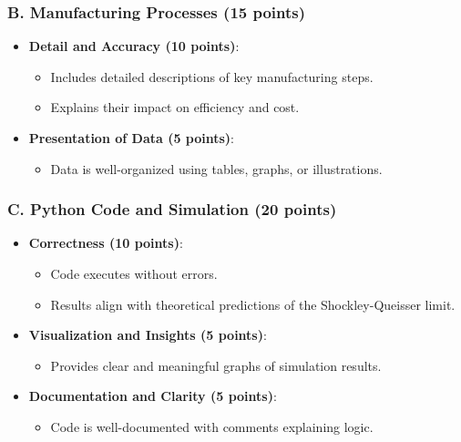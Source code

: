 \documentclass[11pt]{article}
\begin{document}
\subsubsection*{B. Manufacturing Processes (15 points)}
\begin{itemize}
    \item \textbf{Detail and Accuracy (10 points)}:
    \begin{itemize}
        \item Includes detailed descriptions of key manufacturing steps.
        \item Explains their impact on efficiency and cost.
    \end{itemize}
    \item \textbf{Presentation of Data (5 points)}:
    \begin{itemize}
        \item Data is well-organized using tables, graphs, or illustrations.
    \end{itemize}
\end{itemize}

\subsubsection*{C. Python Code and Simulation (20 points)}
\begin{itemize}
    \item \textbf{Correctness (10 points)}:
    \begin{itemize}
        \item Code executes without errors.
        \item Results align with theoretical predictions of the Shockley-Queisser limit.
    \end{itemize}
    \item \textbf{Visualization and Insights (5 points)}:
    \begin{itemize}
        \item Provides clear and meaningful graphs of simulation results.
    \end{itemize}
    \item \textbf{Documentation and Clarity (5 points)}:
    \begin{itemize}
        \item Code is well-documented with comments explaining logic.
    \end{itemize}
\end{itemize}
\end{document}
